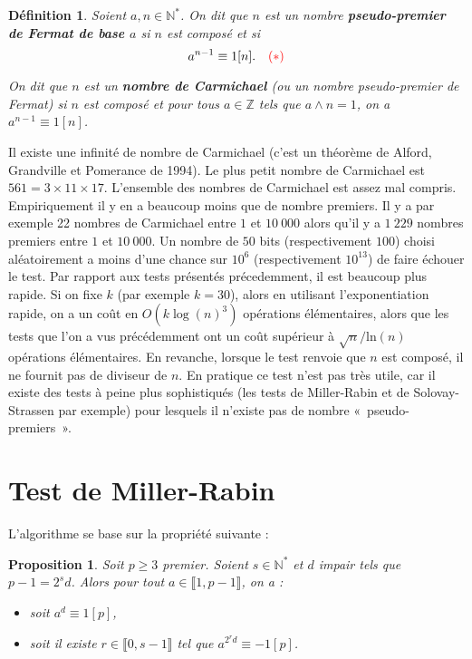 \documentclass[12pt]{report}
\newtheorem{Def}[thm]{Définition}
\newtheorem{Prop}[thm]{Proposition}
\newcommand{\Z}{\mathbb{Z}}
\begin{document}
\begin{Def}
Soient $a,n \in \mathbb{N}^*$.  On dit que $n$ est un nombre \textbf{pseudo-premier de Fermat  de base $a$} si $n$ est composé et si 
$$    a^{n-1} \equiv 1 [n]. \quad {\color{red}(*)}   $$

On dit que $n$ est un \textbf{nombre de Carmichael} (ou un nombre pseudo-premier de Fermat) si $n$ est composé et pour tous $a\in \Z$ tels que $a\wedge n=1$, on a $a^{n-1}\equiv 1[n]$.
\end{Def}

Il existe une infinité de nombre de Carmichael (c'est un théorème de Alford, Grandville et Pomerance de 1994). Le plus petit nombre de Carmichael est $561=3\times 11\times 17$. L'ensemble des nombres de Carmichael est assez mal compris. Empiriquement il y en a beaucoup moins que de nombre premiers. Il y a par exemple 22 nombres de Carmichael entre $1$ et $10\ 000$ alors qu'il y a $1\ 229$ nombres premiers entre $1$ et $10\ 000$.  Un nombre de $50$ bits (respectivement $100$) choisi aléatoirement a moins d'une chance   sur $10^6$ (respectivement $10^{13}$) de faire échouer le test. Par rapport aux tests présentés précedemment, il est beaucoup plus rapide. Si on fixe $k$ (par exemple $k=30$), alors en utilisant l'exponentiation rapide, on a un coût en $O(k\log(n)^3)$ opérations élémentaires, alors que les tests que l'on a vus précédemment ont un coût supérieur à $\sqrt{n}/\mathrm{ln}(n)$ opérations élémentaires. En revanche, lorsque le test renvoie que $n$ est composé, il ne fournit pas de diviseur de $n$. En pratique ce test n'est pas très utile, car il existe des tests à peine plus sophistiqués (les tests de Miller-Rabin et de Solovay-Strassen par exemple) pour lesquels il n'existe pas de nombre «~pseudo-premiers~». 




\section{Test de Miller-Rabin}


L'algorithme se base sur la propriété suivante :

\begin{Prop}
 Soit $p \geq 3$ premier. Soient $s \in \mathbb{N}^*$ et $d$ impair tels que $p-1=2^s d$. Alors pour tout $a\in \llbracket 1,p-1\rrbracket$, on a : \begin{itemize}
 \item[•] soit $a^d \equiv 1 [p]$,
 
 \item[•] soit il existe $r\in \llbracket 0,s-1\rrbracket$ tel que  $a^{2^r d}\equiv -1 [p]$.
 \end{itemize} 
\end{Prop}
\end{document}
